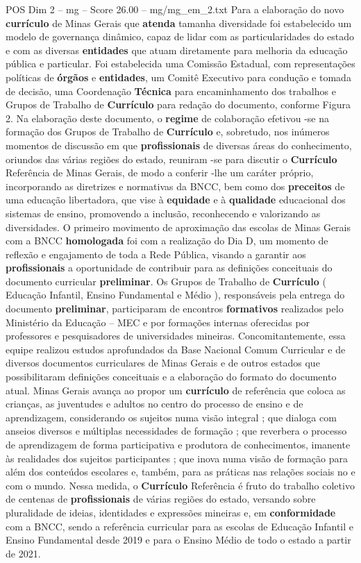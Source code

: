 \begin{textsample}{POS Dim 2 – mg – Score 26.00 – mg/mg\_em\_2.txt}
Para a elaboração do novo \textbf{currículo} de Minas Gerais que \textbf{atenda} tamanha diversidade foi estabelecido um modelo de governança dinâmico, capaz de lidar com as particularidades do estado e com as diversas \textbf{entidades} que atuam diretamente para melhoria da educação pública e particular.
Foi estabelecida uma Comissão Estadual, com representações políticas de \textbf{órgãos} e \textbf{entidades}, um Comitê Executivo para condução e tomada de decisão, uma Coordenação \textbf{Técnica} para encaminhamento dos trabalhos e Grupos de Trabalho de \textbf{Currículo} para redação do documento, conforme Figura 2.
Na elaboração deste documento, o \textbf{regime} de colaboração efetivou -se na formação dos Grupos de Trabalho de \textbf{Currículo} e, sobretudo, nos inúmeros momentos de discussão em que \textbf{profissionais} de diversas áreas do conhecimento, oriundos das várias regiões do estado, reuniram -se para discutir o \textbf{Currículo} Referência de Minas Gerais, de modo a conferir -lhe um caráter próprio, incorporando as diretrizes e normativas da BNCC, bem como dos \textbf{preceitos} de uma educação libertadora, que vise à \textbf{equidade} e à \textbf{qualidade} educacional dos sistemas de ensino, promovendo a inclusão, reconhecendo e valorizando as diversidades.
O primeiro movimento de aproximação das escolas de Minas Gerais com a BNCC \textbf{homologada} foi com a realização do Dia D, um momento de reflexão e engajamento de toda a Rede Pública, visando a garantir aos \textbf{profissionais} a oportunidade de contribuir para as definições conceituais do documento curricular \textbf{preliminar}.
Os Grupos de Trabalho de \textbf{Currículo} ( Educação Infantil, Ensino Fundamental e Médio ), responsáveis pela entrega do documento \textbf{preliminar}, participaram de encontros \textbf{formativos} realizados pelo Ministério da Educação – MEC e por formações internas oferecidas por professores e pesquisadores de universidades mineiras.
Concomitantemente, essa equipe realizou estudos aprofundados da Base Nacional Comum Curricular e de diversos documentos curriculares de Minas Gerais e de outros estados que possibilitaram definições conceituais e a elaboração do formato do documento atual.
Minas Gerais avança ao propor um \textbf{currículo} de referência que coloca as crianças, as juventudes e adultos no centro do processo de ensino e de aprendizagem, considerando os sujeitos numa visão integral ; que dialoga com anseios diversos e múltiplas necessidades de formação ; que reverbera o processo de aprendizagem de forma participativa e produtora de conhecimentos, imanente às realidades dos sujeitos participantes ; que inova numa visão de formação para além dos conteúdos escolares e, também, para as práticas nas relações sociais no e com o mundo.
Nessa medida, o \textbf{Currículo} Referência é fruto do trabalho coletivo de centenas de \textbf{profissionais} de várias regiões do estado, versando sobre pluralidade de ideias, identidades e expressões mineiras e, em \textbf{conformidade} com a BNCC, sendo a referência curricular para as escolas de Educação Infantil e Ensino Fundamental desde 2019 e para o Ensino Médio de todo o estado a partir de 2021.


\end{textsample}
